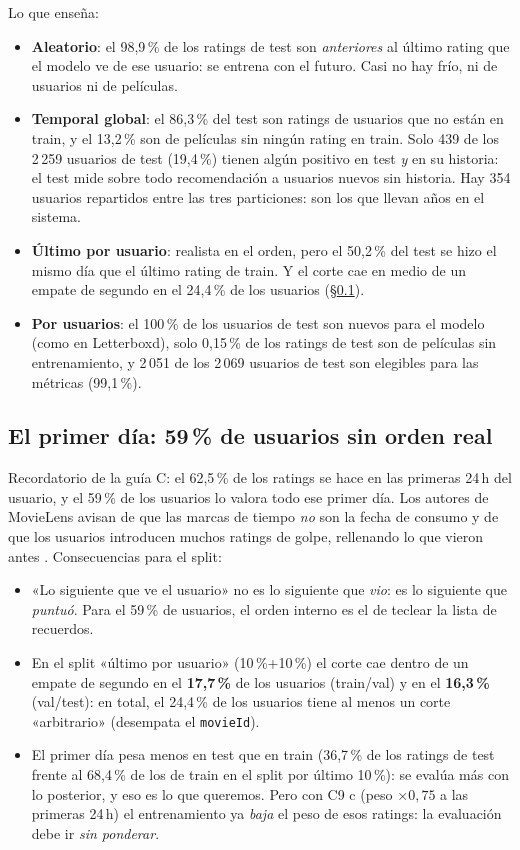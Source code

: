 \documentclass[a4paper,11pt]{article}
\begin{document}
Lo que enseña:
\begin{itemize}
  \item \textbf{Aleatorio}: el 98,9\,\% de los ratings de test son \emph{anteriores} al último rating que el modelo ve de
        ese usuario: se entrena con el futuro. Casi no hay frío, ni de usuarios ni de películas.
  \item \textbf{Temporal global}: el 86,3\,\% del test son ratings de usuarios que no están en train, y el 13,2\,\% son de
        películas sin ningún rating en train. Solo 439 de los 2\,259 usuarios de test (19,4\,\%) tienen algún positivo en
        test \emph{y} en su historia: el test mide sobre todo recomendación a usuarios nuevos sin historia. Hay 354 usuarios
        repartidos entre las tres particiones: son los que llevan años en el sistema.
  \item \textbf{Último por usuario}: realista en el orden, pero el 50,2\,\% del test se hizo el mismo día que el último
        rating de train. Y el corte cae en medio de un empate de segundo en el 24,4\,\% de los usuarios (\S\ref{sec:primerdia}).
  \item \textbf{Por usuarios}: el 100\,\% de los usuarios de test son nuevos para el modelo (como en Letterboxd), solo
        0,15\,\% de los ratings de test son de películas sin entrenamiento, y 2\,051 de los 2\,069 usuarios de test son
        elegibles para las métricas (99,1\,\%).
\end{itemize}

\subsection{El primer día: 59\,\% de usuarios sin orden real}\label{sec:primerdia}
Recordatorio de la guía C: el 62,5\,\% de los ratings se hace en las primeras 24\,h del usuario, y el 59\,\% de los
usuarios lo valora todo ese primer día. Los autores de MovieLens avisan de que las marcas de tiempo \emph{no} son la fecha
de consumo y de que los usuarios introducen muchos ratings de golpe, rellenando lo que vieron antes \cite{harper2015}.
Consecuencias para el split:
\begin{itemize}
  \item «Lo siguiente que ve el usuario» no es lo siguiente que \emph{vio}: es lo siguiente que \emph{puntuó}. Para el
        59\,\% de usuarios, el orden interno es el de teclear la lista de recuerdos.
  \item En el split «último por usuario» (10\,\%+10\,\%) el corte cae dentro de un empate de segundo en el
        \textbf{17,7\,\%} de los usuarios (train/val) y en el \textbf{16,3\,\%} (val/test): en total, el 24,4\,\% de los
        usuarios tiene al menos un corte «arbitrario» (desempata el \texttt{movieId}).
  \item El primer día pesa menos en test que en train (36,7\,\% de los ratings de test frente al 68,4\,\% de los de train
        en el split por último 10\,\%): se evalúa más con lo posterior, y eso es lo que queremos. Pero con C9 c (peso $\times0{,}75$
        a las primeras 24\,h) el entrenamiento ya \emph{baja} el peso de esos ratings: la evaluación debe ir
        \emph{sin ponderar}.
\end{itemize}
\end{document}
